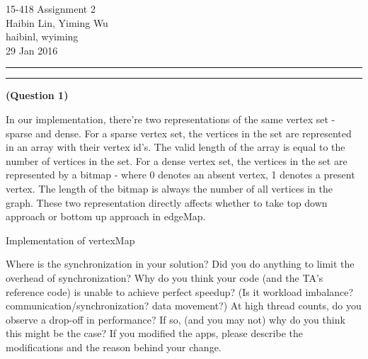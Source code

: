 \documentclass[11pt]{article}
\newcommand{\question}[2] {\vspace{.25in} \hrule\vspace{0.5em}
\noindent{\bf #1: #2} \vspace{0.5em}
\hrule \vspace{.10in}}
\renewcommand{\part}[1] {\vspace{.10in} {\bf (#1)}}
\newcommand{\myhwnum}{2}
\newcommand{\myname}{Haibin Lin, Yiming Wu}
\newcommand{\myandrew}{haibinl, wyiming}
\begin{document}
\medskip                  %

\thispagestyle{plain}
\begin{center}                  %
{\Large 15-418 Assignment \myhwnum} \\
\myname \\
\myandrew \\
29 Jan 2016 \\
\end{center}

\question{Part 1}{SAXPY}

\part{Question 1}


In our implementation, there're two representations of the same vertex set - sparse and dense. For a sparse vertex set, the vertices in the set are represented in an array with their vertex id's. The valid length of the array is equal to the number of vertices in the set. For a dense vertex set, the vertices in the set are represented by a bitmap - where 0 denotes an absent vertex, 1 denotes a present vertex. The length of the bitmap is always the number of all vertices in the graph. These two representation directly affects whether to take top down approach or bottom up approach in edgeMap. 

Implementation of vertexMap 

Where is the synchronization in your solution? Did you do anything to limit the overhead of synchronization?
Why do you think your code (and the TA's reference code) is unable to achieve perfect speedup? (Is it workload imbalance? communication/synchronization? data movement?)
At high thread counts, do you observe a drop-off in performance? If so, (and you may not) why do you think this might be the case?
If you modified the apps, please describe the modifications and the reason behind your change.
\end{document}
